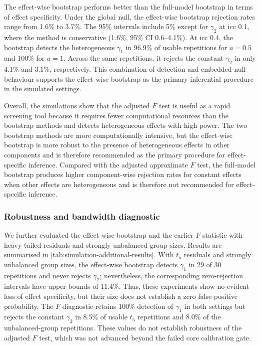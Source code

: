 \documentclass[times]{interact}
\theoremstyle{plain}%
\theoremstyle{definition}
\theoremstyle{remark}
\begin{document}
The effect-wise bootstrap performs better than the full-model bootstrap in terms of effect specificity.
Under the global null, the effect-wise bootstrap rejection rates range from 1.6\% to 3.7\%.
The 95\% intervals include 5\% except for $\gamma_2$ at \gls{icc} 0.1, where the method is conservative (1.6\%, 95\% CI 0.6--4.1\%).
At \gls{icc} 0.4, the bootstrap detects the heterogeneous $\gamma_1$ in 96.9\% of usable repetitions for $a=0.5$ and 100\% for $a=1$.
Across the same repetitions, it rejects the constant $\gamma_2$ in only 4.1\% and 3.1\%, respectively.
This combination of detection and embedded-null behaviour supports the effect-wise bootstrap as the primary inferential procedure in the simulated settings.

Overall, the simulations show that the adjusted $F$ test is useful as a rapid screening tool because it requires fewer computational resources than the bootstrap methods and detects heterogeneous effects with high power.
The two bootstrap methods are more computationally intensive, but the effect-wise bootstrap is more robust to the presence of heterogeneous effects in other components and is therefore recommended as the primary procedure for effect-specific inference.
Compared with the adjusted approximate $F$ test, the full-model bootstrap produces higher component-wise rejection rates for constant effects when other effects are heterogeneous and is therefore not recommended for effect-specific inference.

\subsubsection{Robustness and bandwidth diagnostic}



We further evaluated the effect-wise bootstrap and the earlier $F$ statistic with heavy-tailed residuals and strongly unbalanced group sizes.
Results are summarised in \autoref{tab:simulation-additional-results}.
With $t_5$ residuals and strongly unbalanced group sizes, the effect-wise bootstrap detects $\gamma_1$ in 29 of 30 repetitions and never rejects $\gamma_2$; nevertheless, the corresponding zero-rejection intervals have upper bounds of 11.4\%.
Thus, these experiments show no evident loss of effect specificity, but their size does not establish a zero false-positive probability.
The $F$ diagnostic retains 100\% detection of $\gamma_1$ in both settings but rejects the constant $\gamma_2$ in 8.5\% of usable $t_5$ repetitions and 8.0\% of the unbalanced-group repetitions.
These values do not establish robustness of the adjusted $F$ test, which was not advanced beyond the failed core calibration gate.
\end{document}

